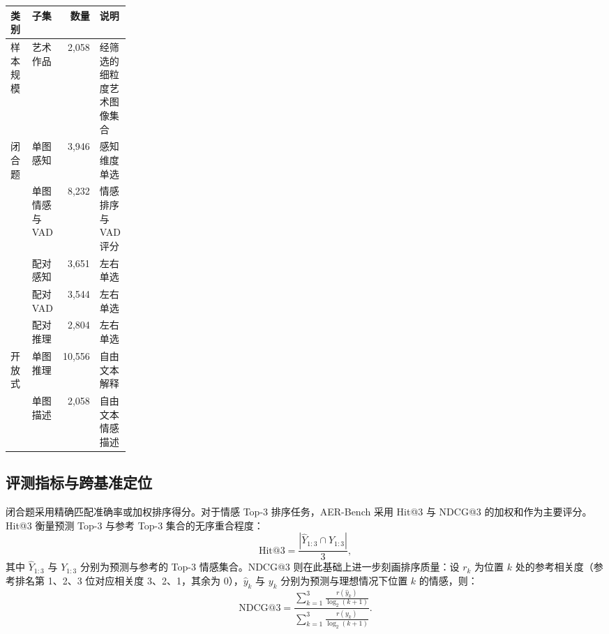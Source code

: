 \begin{table}[!htbp]
    \vspace{0.5em}\centering\wuhao
    \setlength{\tabcolsep}{4pt}
    \begin{tabularx}{\linewidth}{@{}p{0.20\linewidth}XrX@{}}
    \toprule
    \textbf{类别} & \textbf{子集} & \textbf{数量} & \textbf{说明} \\
    \midrule
    样本规模
        & 艺术作品 & 2,058 & 经筛选的细粒度艺术图像集合 \\
    \midrule
    \multirow{5}{=}{闭合题}
        & 单图感知 & 3,946 & 感知维度单选 \\
        & 单图情感与 VAD & 8,232 & 情感排序与 VAD 评分 \\
        & 配对感知 & 3,651 & 左右单选 \\
        & 配对 VAD & 3,544 & 左右单选 \\
        & 配对推理 & 2,804 & 左右单选 \\
    \midrule
    \multirow{2}{=}{开放式}
        & 单图推理 & 10,556 & 自由文本解释 \\
        & 单图描述 & 2,058 & 自由文本情感描述 \\
    \bottomrule
    \end{tabularx}
\end{table}

\subsection{评测指标与跨基准定位}

\label{sec:chap5_metrics}

闭合题采用精确匹配准确率或加权排序得分。对于情感 Top-3 排序任务，AER-Bench 采用 Hit@3 与 NDCG@3 的加权和作为主要评分。Hit@3 衡量预测 Top-3 与参考 Top-3 集合的无序重合程度：
\begin{equation}
\mathrm{Hit@3}=\frac{|\hat{Y}_{1:3}\cap Y_{1:3}|}{3},
\label{eq:chap6_hit3}
\end{equation}
其中 $\hat{Y}_{1:3}$ 与 $Y_{1:3}$ 分别为预测与参考的 Top-3 情感集合。NDCG@3 则在此基础上进一步刻画排序质量：设 $r_k$ 为位置 $k$ 处的参考相关度（参考排名第 1、2、3 位对应相关度 3、2、1，其余为 0），$\hat{y}_k$ 与 $y_k$ 分别为预测与理想情况下位置 $k$ 的情感，则：
\begin{equation}
\mathrm{NDCG@3}=\frac{\sum_{k=1}^{3}\frac{r(\hat{y}_k)}{\log_2(k+1)}}{\sum_{k=1}^{3}\frac{r(y_k)}{\log_2(k+1)}}.
\label{eq:chap6_ndcg3}
\end{equation}

